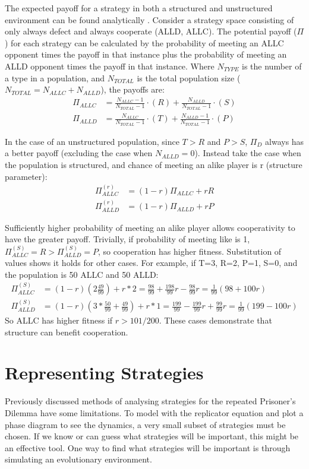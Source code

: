 \documentclass[a4paper,11pt,bcshonoursthesis,singlespace,oneside,thesisdraft,pdflatex]{cssethesis}
\begin{document}
The expected payoff for a strategy in both a structured and unstructured environment can be found analytically \citep{van-veelen:PNAS:2012}. 
Consider a strategy space consisting of only always defect and always cooperate (ALLD, ALLC). 
The potential payoff ($\Pi$) for each strategy can be calculated by the probability of meeting an ALLC opponent times the payoff in that instance plus the probability of meeting an ALLD opponent times the payoff in that instance. Where $N_{TYPE}$ is the number of a type in a population, and $N_{TOTAL}$ is the total population size ($N_{TOTAL}=N_{ALLC}+ N_{ALLD}$), the payoffs are:
\begin{align*}
\Pi_{ALLC}&=\frac{N_{ALLC}-1}{N_{TOTAL}-1} \cdot (R) + \frac{N_{ALLD}}{N_{TOTAL}-1}\cdot ({S})\\
\Pi_{ALLD}&=\frac{N_{ALLC}}{N_{TOTAL}-1} \cdot (T) + \frac{N_{ALLD}-1}{N_{TOTAL}-1}\cdot ({P})
\end{align*}

In the case of an unstructured population, since $T>R$ and $P>S$, $\Pi_D$ always has a better payoff (excluding the case when $N_{ALLD}=0$). 
Instead take the case when the population is structured, and chance of meeting an alike player is r (structure parameter):
\begin{align*}
\Pi^{(r)}_{ALLC}&=(1-r)\Pi_{ALLC}+ rR\\
\Pi^{(r)}_{ALLD}&=(1-r)\Pi_{ALLD}+ rP
\end{align*}

Sufficiently higher probability of meeting an alike player allows cooperativity to have the greater payoff. 
Trivially, if probability of meeting like is 1, $\Pi^{(S)}_{ALLC}=R>\Pi^{(S)}_{ALLD}=P$, so cooperation has higher fitness.  
Substitution of values shows it holds for other cases. 
For example, if T=3, R=2, P=1, S=0, and the population is 50 ALLC and 50 ALLD:
\begin{align*}
\Pi^{(S)}_{ALLC}&=(1-r)(2\frac{49}{99})+r*2=\frac{98}{99}+\frac{198}{99}r-\frac{98}{99}r=\frac{1}{99}(98+100r)\\
\Pi^{(S)}_{ALLD}&=(1-r)(3*\frac{50}{99} + \frac{49}{99})+ r*1=\frac{199}{99}-\frac{199}{99}r+\frac{99}{99}r=\frac{1}{99}(199-100r)
\end{align*}
So ALLC has higher fitness if $r>101/200$. These cases demonstrate that structure can benefit cooperation. 
\section{Representing Strategies}
Previously discussed methods of analysing strategies for the repeated Prisoner's Dilemma have some limitations. 
To model with the replicator equation and plot a phase diagram to see the dynamics, a very small subset of strategies must be chosen. 
If we know or can guess what strategies will be important, this might be an effective tool. 
One way to find what strategies will be important is through simulating an evolutionary environment. 
\end{document}
